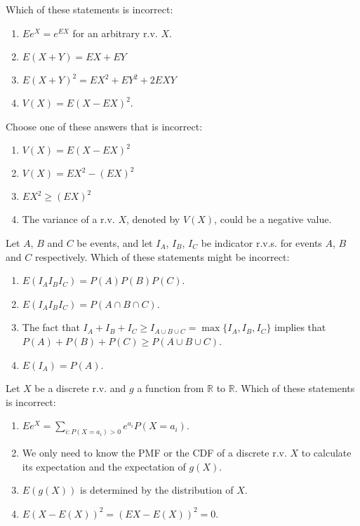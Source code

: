 \documentclass[poll_tutorial_format]{subfiles}
\begin{document}
	
	\begin{exercise}
		Which of these statements is incorrect: 
		\begin{enumerate}
			\item $Ee^X=e^{EX}$ for an arbitrary r.v. $X$.  
			\item $E(X+Y)=EX+EY$
			\item $E(X+Y)^2 =EX^2 +EY^2 +2EXY$  
			\item $V(X)=E\left(X-EX \right)^2$.  
		\end{enumerate}
	\end{exercise}
	
	
		
	\begin{exercise}
		Choose one of these answers that is incorrect:
		\begin{enumerate}
			\item $V(X)=E\left(X-EX \right)^2$  
			\item $V(X)=EX^2 -\left(EX \right)^2$
			\item $EX^2 \geq \left(EX \right)^2$  
			\item The variance of a r.v. $X$, denoted by $V(X)$, could be a negative value.
		\end{enumerate}
	\end{exercise}
	
	
	\begin{exercise}
		Let $A$, $B$ and $C$ be events, and let $I_A$, $I_B$, $I_C$ be indicator r.v.s. for events $A$, $B$  and $C$ respectively. 
		Which of these statements might be incorrect: 
		\begin{enumerate}
			\item $E(I_AI_BI_C)=P(A)P(B)P(C)$.
			\item $E(I_AI_BI_C)=P(A\cap B\cap C)$.  
			\item The fact that $I_A+I_B+I_C \geq I_{A\cup B \cup C}= \max\{I_A, I_B, I_C\}$ implies that $P(A)+P(B)+P(C) \geq P(A\cup B \cup C)$.
			\item $E(I_A)=P(A)$.
		\end{enumerate}
	\end{exercise}
	 

	\begin{exercise}
		Let $X$ be a discrete r.v. and $g$ a function from $\mathbb{R}$ to $\mathbb{R}$.
		Which of these statements is incorrect: 
		\begin{enumerate}
			\item $Ee^X= \sum_{i: P(X=a_i)>0} e^{a_i} P(X=a_i)$.
			\item We only need to know the PMF or the CDF of a discrete r.v. $X$ to calculate its expectation and the expectation of $g(X)$.
			\item $E(g(X))$ is determined by the distribution of $X$.
			\item $E(X-E(X))^2 = (EX-E(X))^2=0$.
		\end{enumerate}
	\end{exercise}
	
\end{document}
